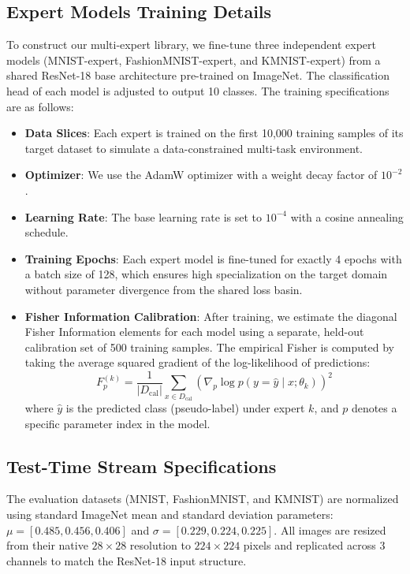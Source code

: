 \documentclass{article}
\theoremstyle{plain}
\theoremstyle{definition}
\theoremstyle{remark}
\begin{document}
\subsection{Expert Models Training Details}
\label{app:expert_training}
To construct our multi-expert library, we fine-tune three independent expert models (MNIST-expert, FashionMNIST-expert, and KMNIST-expert) from a shared ResNet-18 base architecture pre-trained on ImageNet. The classification head of each model is adjusted to output 10 classes. The training specifications are as follows:
\begin{itemize}
    \item \textbf{Data Slices}: Each expert is trained on the first 10,000 training samples of its target dataset to simulate a data-constrained multi-task environment.
    \item \textbf{Optimizer}: We use the AdamW optimizer with a weight decay factor of $10^{-2}$.
    \item \textbf{Learning Rate}: The base learning rate is set to $10^{-4}$ with a cosine annealing schedule.
    \item \textbf{Training Epochs}: Each expert model is fine-tuned for exactly 4 epochs with a batch size of 128, which ensures high specialization on the target domain without parameter divergence from the shared loss basin.
    \item \textbf{Fisher Information Calibration}: After training, we estimate the diagonal Fisher Information elements for each model using a separate, held-out calibration set of 500 training samples. The empirical Fisher is computed by taking the average squared gradient of the log-likelihood of predictions:
    \begin{equation}
        F_p^{(k)} = \frac{1}{|D_{\text{cal}}|} \sum_{x \in D_{\text{cal}}} \left( \nabla_p \log p(y = \hat{y} \mid x; \theta_k) \right)^2
    \end{equation}
    where $\hat{y}$ is the predicted class (pseudo-label) under expert $k$, and $p$ denotes a specific parameter index in the model.
\end{itemize}

\subsection{Test-Time Stream Specifications}
\label{app:stream_details}
The evaluation datasets (MNIST, FashionMNIST, and KMNIST) are normalized using standard ImageNet mean and standard deviation parameters: $\mu = [0.485, 0.456, 0.406]$ and $\sigma = [0.229, 0.224, 0.225]$. All images are resized from their native $28 \times 28$ resolution to $224 \times 224$ pixels and replicated across 3 channels to match the ResNet-18 input structure.
\end{document}
